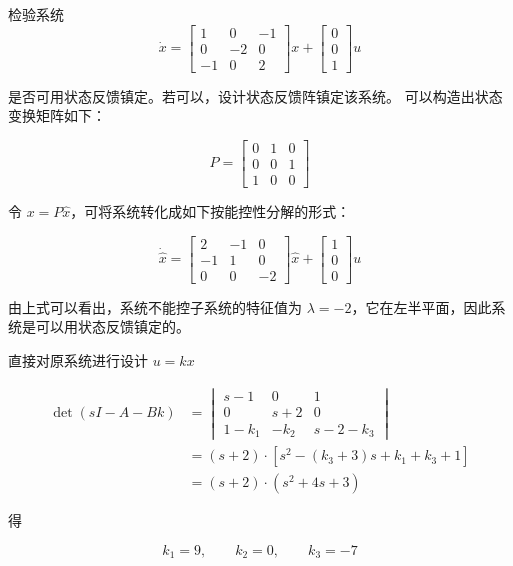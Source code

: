 \begin{example}
    检验系统
        \[
    \dot{x}=
    \begin{bmatrix}
    1 & 0 & -1\\
    0 & -2 & 0\\
    -1 & 0 & 2
    \end{bmatrix}x+
    \begin{bmatrix}
    0\\
    0\\
    1
    \end{bmatrix}u
    \]

    是否可用状态反馈镇定。若可以，设计状态反馈阵镇定该系统。
    \tcblower
    可以构造出状态变换矩阵如下：

    \[
    P=
    \begin{bmatrix}
    0 & 1 & 0\\
    0 & 0 & 1\\
    1 & 0 & 0
    \end{bmatrix}
    \]

    令 $x=P\hat{x}$，可将系统转化成如下按能控性分解的形式：

    \[
    \dot{\hat{x}}=
    \begin{bmatrix}
    2 & -1 & 0\\
    -1 & 1 & 0\\
    0 & 0 & -2
    \end{bmatrix}\hat{x}
    +
    \begin{bmatrix}
    1\\
    0\\
    0
    \end{bmatrix}u
    \]

    由上式可以看出，系统不能控子系统的特征值为 $\lambda=-2$，它在左半平面，因此系统是可以用状态反馈镇定的。

    直接对原系统进行设计 $u=kx$

    \[
    \begin{aligned}
    \det(sI-A-Bk)
    &=
    \begin{vmatrix}
    s-1 & 0 & 1\\
    0 & s+2 & 0\\
    1-k_1 & -k_2 & s-2-k_3
    \end{vmatrix} \\
    &=(s+2)\cdot\left[s^2-(k_3+3)s+k_1+k_3+1\right] \\
    &=(s+2)\cdot(s^2+4s+3)
    \end{aligned}
    \]

    得

    \[
    k_1=9,\qquad k_2=0,\qquad k_3=-7
    \]
\end{example}

